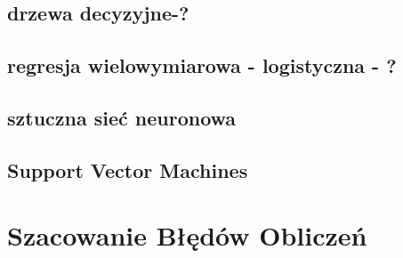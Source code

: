 \documentclass[12pt,a4paper]{report}
\begin{document}
\subsection{drzewa decyzyjne-?}
\subsection{regresja wielowymiarowa - logistyczna - ?}
\subsection{sztuczna sieć neuronowa}
\subsection{Support Vector Machines}

\section{Szacowanie Błędów Obliczeń}
\end{document}
